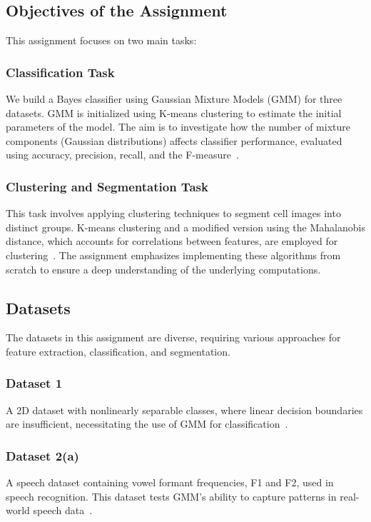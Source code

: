 \documentclass[conference]{IEEEtran}
\begin{document}
	\subsection{Objectives of the Assignment}
	
	This assignment focuses on two main tasks:
	
	\subsubsection{Classification Task}
	We build a Bayes classifier using Gaussian Mixture Models (GMM) for three datasets. GMM is initialized using K-means clustering to estimate the initial parameters of the model. The aim is to investigate how the number of mixture components (Gaussian distributions) affects classifier performance, evaluated using accuracy, precision, recall, and the F-measure~\cite{murphy2012machine}.
	
	\subsubsection{Clustering and Segmentation Task}
	This task involves applying clustering techniques to segment cell images into distinct groups. K-means clustering and a modified version using the Mahalanobis distance, which accounts for correlations between features, are employed for clustering~\cite{hastie2009elements}. The assignment emphasizes implementing these algorithms from scratch to ensure a deep understanding of the underlying computations.
	
	\subsection{Datasets}
	
	The datasets in this assignment are diverse, requiring various approaches for feature extraction, classification, and segmentation.
	
	\subsubsection{Dataset 1}
	A 2D dataset with nonlinearly separable classes, where linear decision boundaries are insufficient, necessitating the use of GMM for classification~\cite{duda2000pattern}.
	
	\subsubsection{Dataset 2(a)}
	A speech dataset containing vowel formant frequencies, F1 and F2, used in speech recognition. This dataset tests GMM's ability to capture patterns in real-world speech data~\cite{mitchell1997machine}.
	
\end{document}

